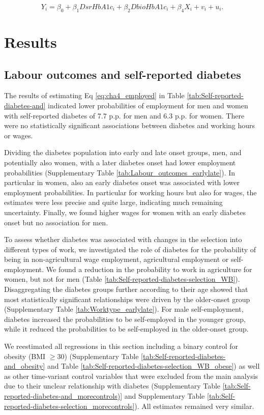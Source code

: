 \documentclass[12pt,english]{article}
\begin{document}
\begin{equation}
Y_{i}=\beta_{0}+\beta_{1}DsrHbA1c_{i}+\beta_{2}DbioHbA1c_{i}+\beta_{4}X_{i}+v_{i}+u_{i}.\label{eq:diab_hba1c}
\end{equation}

\section{\label{sec:cha_4_results}Results}


\subsection{Labour outcomes and self-reported diabetes}

The results of estimating Eq \ref{eq:cha4_employed} in Table \ref{tab:Self-reported-diabetes-and} indicated lower probabilities of employment for men and women with self-reported diabetes of 7.7 \ac{p.p.} for men and 6.3 \ac{p.p.} for women. There were no statistically significant associations between diabetes and working hours or wages. 

Dividing the diabetes population into early and late onset groups, men, and potentially also women, with a later diabetes onset had lower employment probabilities (Supplementary Table \ref{tab:Labour_outcomes_earlylate}). In particular in women, also an early diabetes onset was associated with lower employment probabilities. In particular for working hours but also for wages, the estimates were less precise and quite large, indicating much remaining uncertainty. Finally, we found higher wages for women with an early diabetes onset but no association for men. 


To assess whether diabetes was associated with changes in the selection into different types of work, we investigated the role of diabetes for the probability of being in non-agricultural wage employment, agricultural employment or self-employment. We found a reduction in the probability to work in agriculture for women, but not for men (Table \ref{tab:Self-reported-diabetes-selection_WB}). Disaggregating the diabetes groups further according to their age showed that most statistically significant relationships were driven by the older-onset group (Supplementary Table \ref{tab:Worktype_earlylate}). For male self-employment, diabetes increased the probabilities to be self-employed in the younger group, while it reduced the probabilities to be self-employed in the older-onset group.


We reestimated all regressions in this section including a binary control for obesity (BMI $\geq 30$) (Supplementary Table \ref{tab:Self-reported-diabetes-and_obesity} and Table \ref{tab:Self-reported-diabetes-selection_WB_obese}) as well as other time-variant control variables that were excluded from the main analysis due to their unclear relationship with diabetes (Supplementary Table \ref{tab:Self-reported-diabetes-and_morecontrols)} and Supplementary Table \ref{tab:Self-reported-diabetes-selection_morecontrols}). All estimates remained very similar.
\end{document}
